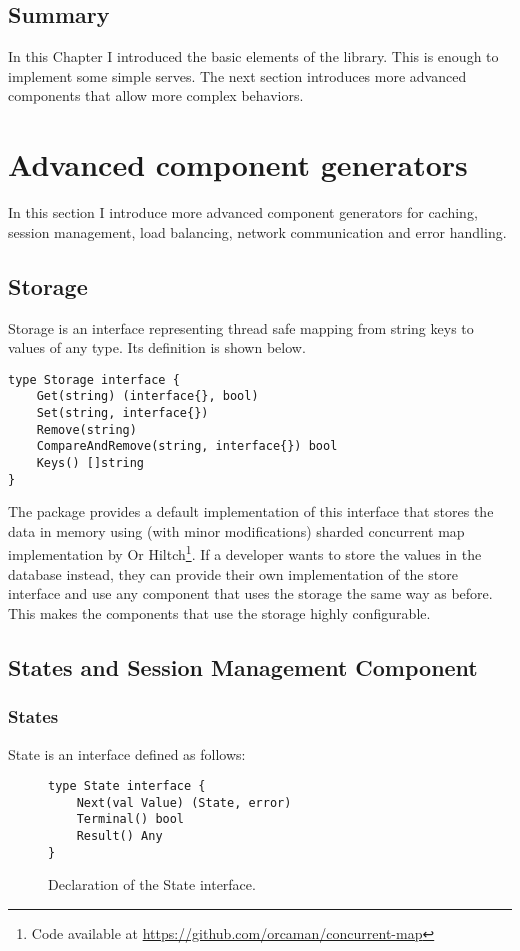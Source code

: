 \documentclass[12pt,a4paper]{article}
\begin{document}
\subsection{Summary}
In this Chapter I introduced the basic elements of the library. This 
is enough to implement some simple serves. The next section introduces
more advanced components that allow more complex behaviors.


\newpage
\section{Advanced component generators}
In this section I introduce more advanced component generators for caching,
session management, load balancing, network communication and error handling.

\subsection{Storage}
Storage is an interface representing thread safe mapping from string keys
to values of any type. Its definition is shown below.
\begin{lstlisting}
type Storage interface {
    Get(string) (interface{}, bool)
    Set(string, interface{})
    Remove(string)
    CompareAndRemove(string, interface{}) bool
    Keys() []string
}
\end{lstlisting}
The package provides a default implementation of this interface that
stores the data in memory using (with minor modifications) sharded concurrent map implementation
by Or Hiltch\footnote{Code available at \url{https://github.com/orcaman/concurrent-map}}.
If a developer wants to store the values in the 
database instead, they can provide their own implementation of the store interface
and use any component that uses the storage the same way as before.
This makes the components that use the storage highly configurable.


\subsection{States and Session Management Component}
\subsubsection{States}
State is an interface defined as follows:
\begin{figure}[h]
\centering
\begin{lstlisting}
type State interface {
    Next(val Value) (State, error)
    Terminal() bool
    Result() Any
}
\end{lstlisting}
\caption[scale=1.0]{Declaration of the State interface.}
\label{fig:State}
\end{figure}
\end{document}
